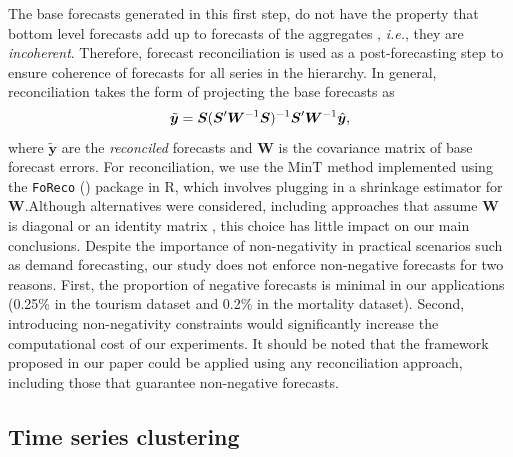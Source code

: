 \documentclass[a4paper,review,12pt,authoryear]{elsarticle}
\begin{document}
The base forecasts generated in this first step, do not have the property that bottom level forecasts add up to forecasts of the aggregates , \textit{i.e.}, they are \textit{incoherent}. Therefore, forecast reconciliation is used as a post-forecasting step to ensure coherence of forecasts for all series in the hierarchy. In general, reconciliation takes the form of projecting the base forecasts as
\vspace{-0.1in}
\[
    \tilde{\boldsymbol{y}} = \boldsymbol{S}(\boldsymbol{S}'\boldsymbol{W}^{-1}\boldsymbol{S})^{-1}\boldsymbol{S}'\boldsymbol{W}^{-1}\hat{\boldsymbol{y}},
  \vspace{-0.15in}
\]
where $\tilde{\boldsymbol{y}}$ are the \textit{reconciled} forecasts and $\boldsymbol{W}$ is the covariance matrix of base forecast errors. {For reconciliation, we use the MinT method \citep{wickramasuriyaOptimalForecastReconciliation2019} implemented using the \texttt{FoReco} (\citealp{FoReco}) package in R, which involves plugging in a shrinkage estimator for $\boldsymbol{W}$.}Although alternatives were considered, including approaches that assume $\boldsymbol{W}$ is diagonal or an identity matrix \citep{hyndmanOptimalCombinationForecasts2011}, this choice has little impact on our main conclusions. {Despite the importance of non-negativity in practical scenarios such as demand forecasting, our study does not enforce non-negative forecasts for two reasons. First, the proportion of negative forecasts is minimal in our applications (0.25\% in the tourism dataset and 0.2\% in the mortality dataset). Second, introducing non-negativity constraints would significantly increase the computational cost of our experiments. It should be noted that the framework proposed in our paper could be applied using any reconciliation approach, including those that guarantee non-negative forecasts.} 

 
\subsection{Time series clustering} 
\label{sec:clustering}
\end{document}
